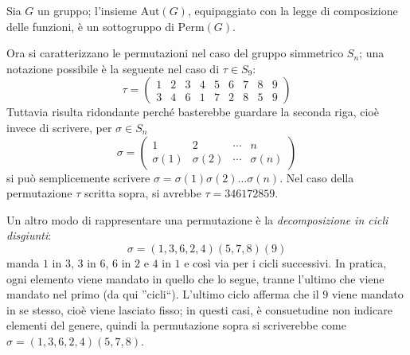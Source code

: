 \documentclass[11pt, a4paper]{scrartcl}
\theoremstyle{definition}
\numberwithin{esempio}{section}
\theoremstyle{definition}
\numberwithin{obs}{section}
\numberwithin{nota}{section}
\numberwithin{equation}{subsection}
\begin{document}
\begin{prop}
	{}{}
	Sia $G$ un gruppo; l'insieme $\mathrm{Aut} (G)$, equipaggiato con la legge di composizione delle funzioni, \`e un sottogruppo di $\mathrm{Perm} (G)$.
\end{prop}

Ora si caratterizzano le permutazioni nel caso del gruppo simmetrico $S_n$; una notazione possibile \`e la seguente nel caso di $\tau  \in S_9$:
\[
	\tau  = \begin{pmatrix} 1 & 2&3&4&5&6&7&8&9\\3&4&6&1&7&2&8&5&9 \end{pmatrix} 
\] 
Tuttavia risulta ridondante perch\'e basterebbe guardare la seconda riga, cio\`e invece di scrivere, per $\sigma  \in S_n$
\[
	\sigma  = \begin{pmatrix} 1 & 2 & \cdots& n\\ \sigma (1) & \sigma (2) & \cdots& \sigma (n) \end{pmatrix} 
\] 
si pu\`o semplicemente scrivere $\sigma  = \sigma (1) \sigma (2) \ldots \sigma (n)$.
Nel caso della permutazione $\tau $ scritta sopra, si avrebbe $\tau  = 346172859$.

Un altro modo di rappresentare una permutazione \`e la \textit{decomposizione in cicli disgiunti}:
\[
\sigma = (1,3,6,2,4)(5,7,8)(9)
\] 
manda $1$ in $3$, $3$ in $6$, $6$ in $2$ e $4$ in $1$ e cos\`i via per i cicli successivi. 
In pratica, ogni elemento viene mandato in quello che lo segue, tranne l'ultimo che viene mandato nel primo (da qui ''cicli``).
L'ultimo ciclo afferma che il $9$ viene mandato in se stesso, cio\`e viene lasciato fisso; in questi casi, \`e consuetudine non indicare elementi del genere, quindi la permutazione sopra si scriverebbe come $\sigma  = (1,3,6,2,4)(5,7,8)$.
\end{document}
